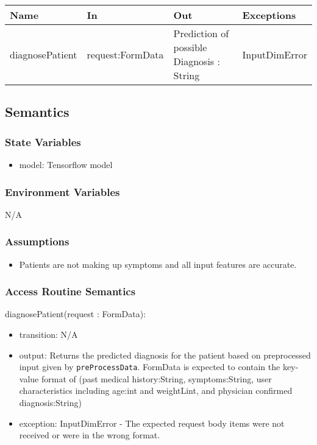 \documentclass[12pt, titlepage]{article}
\begin{document}
\begin{center}
\begin{tabular}{p{2cm} p{4cm} p{4cm} p{2cm}}
\hline
\textbf{Name} & \textbf{In} & \textbf{Out} & \textbf{Exceptions} \\
\hline
diagnosePatient & request:FormData & Prediction of possible Diagnosis : String & InputDimError \\
\hline
\end{tabular}
\end{center}

\subsection{Semantics}

\subsubsection{State Variables}

\begin{itemize}
  \item model: Tensorflow model
\end{itemize}

\subsubsection{Environment Variables}

N/A

\subsubsection{Assumptions}

\begin{itemize}
  \item Patients are not making up symptoms and all input features are accurate.
\end{itemize}

\subsubsection{Access Routine Semantics}

\noindent diagnosePatient(request : FormData):
\begin{itemize}
\item transition: N/A
\item output: Returns the predicted diagnosis for the patient based on preprocessed input given by \texttt{preProcessData}. FormData is expected to contain the key-value format of (past medical history:String, symptoms:String, user characteristics including age:int and weightLint, and physician confirmed diagnosis:String)
\item exception: InputDimError - The expected request body items were not received or were in the wrong format.
\end{itemize}
\end{document}

